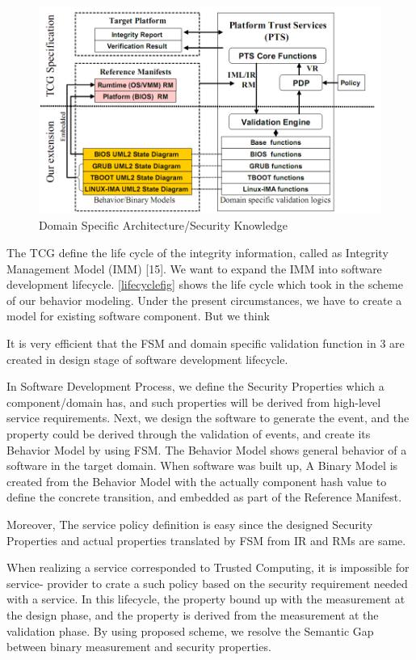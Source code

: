 \documentclass[12pt,a4paper]{article}
\begin{document}
\begin{figure}[b!p]
  \begin{center}
    \includegraphics[width=12cm]{OpenPTS_fig3.png}
  \end{center}
  \caption{Domain Specific Architecture/Security Knowledge}
  \label{domainfig} 
\end{figure}


The TCG define the life cycle of the integrity information, called as Integrity Management Model
(IMM) [15]. We want to expand the IMM into software development lifecycle.
\ref{lifecyclefig} shows the life cycle which took in the scheme of our behavior modeling. Under the
present circumstances, we have to create a model for existing software component. But we think

 It is very efficient that the FSM and domain specific validation function in 3 are created in design
stage of software development lifecycle.

     In Software Development Process, we define the Security Properties which a component/domain
has, and such properties will be derived from high-level service requirements. Next, we design the
software to generate the event, and the property could be derived through the validation of events,
and create its Behavior Model by using FSM. The Behavior Model shows general behavior of a
software in the target domain. When software was built up, A Binary Model is created from the
Behavior Model with the actually component hash value to define the concrete transition, and
embedded as part of the Reference Manifest.

     Moreover, The service policy definition is easy since the designed Security Properties and actual
properties translated by FSM from IR and RMs are same.

     When realizing a service corresponded to Trusted Computing, it is impossible for service-
provider to crate a such policy based on the security requirement needed with a service. In this
lifecycle, the property bound up with the measurement at the design phase, and the property is
derived from the measurement at the validation phase. By using proposed scheme, we resolve the
Semantic Gap between binary measurement and security properties.
\end{document}
